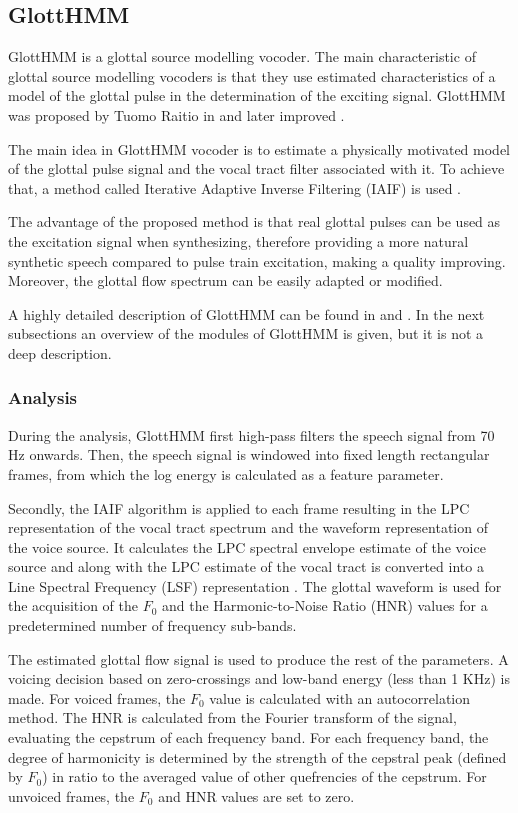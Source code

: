 \subsection{GlottHMM}
\label{vocoders_glott}
GlottHMM is a glottal source modelling vocoder.
%
The main characteristic of glottal source modelling vocoders is that they use estimated characteristics of a model of the glottal pulse in the determination of the exciting signal.
%
GlottHMM was proposed by Tuomo Raitio in \cite{TuomoMSc} and later improved \cite{raitio_tasl}.

The main idea in GlottHMM vocoder is to estimate a physically motivated model of the glottal pulse signal and the vocal tract filter associated with it.
%
To achieve that, a method called Iterative Adaptive Inverse Filtering (IAIF) is used \cite{alku1992glottal}.
%

The advantage of the proposed method is that real glottal pulses can be used as the excitation signal when synthesizing, therefore providing a more natural synthetic speech compared to pulse train excitation, making a quality improving.
%
Moreover, the glottal flow spectrum can be easily adapted or modified.

A highly detailed description of GlottHMM can be found in \cite{TuomoMSc} and \cite{manuMSc}.
%
In the next subsections an overview of the modules of GlottHMM is given, but it is not a deep description.

\subsubsection{Analysis}
\label{vocoders_glott_analysis}
During the analysis, GlottHMM first high-pass filters the speech signal from 70 Hz onwards.
%
Then, the speech signal is windowed into fixed length rectangular frames, from which the log energy is calculated as a feature parameter.

Secondly, the IAIF algorithm is applied to each frame resulting in the LPC representation of the vocal tract spectrum and the waveform representation of the voice source.
%
It calculates the LPC spectral envelope estimate of the voice source and along with the LPC estimate of the vocal tract is converted into a Line Spectral Frequency (LSF) representation \cite{manuMSc}.
%
The glottal waveform is used for the acquisition of the $F_{0}$ and the Harmonic-to-Noise Ratio (HNR) values for a predetermined number of frequency sub-bands.

The estimated glottal flow signal is used to produce the rest of the parameters. A voicing decision based on zero-crossings and low-band energy (less than 1 KHz) is made.
%
For voiced frames, the $F_{0}$ value is calculated with an autocorrelation method.
%
The HNR is calculated from the Fourier transform of the signal, evaluating the cepstrum of each frequency band.
%
For each frequency band, the degree of harmonicity is determined by the strength of the cepstral peak (defined by $F_{0}$) in ratio to the averaged value of other quefrencies of the cepstrum. 
%
For unvoiced frames, the $F_{0}$ and HNR values are set to zero.

